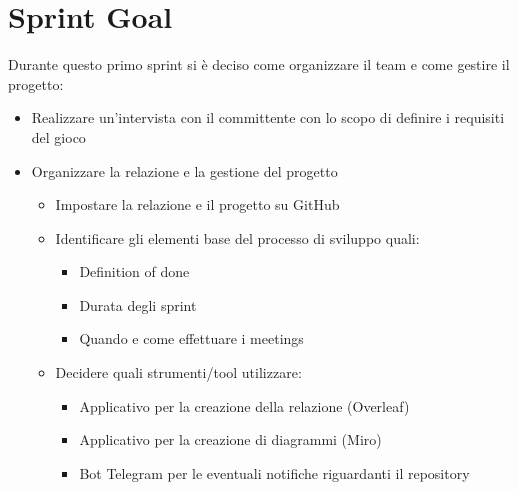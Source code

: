 \section{Sprint Goal}
Durante questo primo sprint si è deciso come organizzare il team e come gestire il progetto:
\begin{itemize}
    \item Realizzare un'intervista con il committente con lo scopo di definire i requisiti del gioco
    \item Organizzare la relazione e la gestione del progetto
    \begin{itemize}
        \item Impostare la relazione e il progetto su GitHub
        \item Identificare gli elementi base del processo di sviluppo quali:
            \begin{itemize}
                \item Definition of done
                \item Durata degli sprint
                \item Quando e come effettuare i meetings
            \end{itemize}  
        \item Decidere quali strumenti/tool utilizzare:
            \begin{itemize}
                \item Applicativo per la creazione della relazione (Overleaf)
                \item Applicativo per la creazione di diagrammi (Miro)
                \item Bot Telegram per le eventuali notifiche riguardanti il repository
            \end{itemize}        
        \end{itemize}   
\end{itemize}
